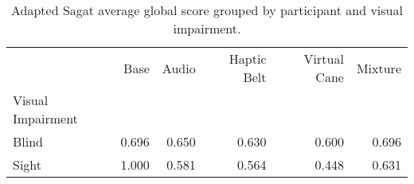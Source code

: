 
\begin{table}[!htb]
\centering
\caption{Adapted Sagat average global score grouped by participant and visual impairment.}
\label{tab:sagat_average_group}
\begin{tabular}{lrrrrr}
\toprule
{} &  Base &  Audio &  Haptic Belt &  Virtual Cane &  Mixture \\
Visual Impairment &       &        &              &               &          \\
\midrule
Blind             & 0.696 &  0.650 &        0.630 &         0.600 &    0.696 \\
Sight             & 1.000 &  0.581 &        0.564 &         0.448 &    0.631 \\
\bottomrule
\end{tabular}
\end{table}

